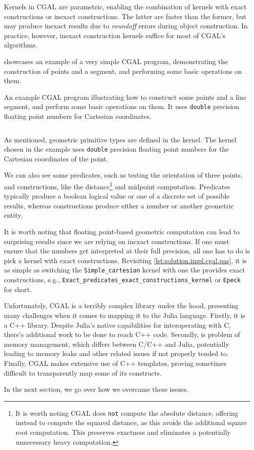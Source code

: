 Kernels in \ac{CGAL} are parametric, enabling the combination of kernels with
exact constructions or inexact constructions.  The latter are faster than the
former, but may produce inexact results due to \textit{roundoff} errors during
object construction.  In practice, however, inexact construction kernels suffice
for most of \ac{CGAL}'s algorithms.

 showcases an example of a very simple
\ac{CGAL} program, demonstrating the construction of points and a segment, and
performing some basic operations on them.

\begin{listing}[htbp]
  \caption[CGAL: Three points and one segment]{
    An example CGAL program illustrating how to construct some points and a line
    segment, and perform some basic operations on them.  It uses
    \texttt{double} precision floating point numbers for Cartesian
    coordinates.}\label{lst:solution.impl.cgal.pas}
  \inputminted{cpp}{cpp/points_and_segments.cpp}
\end{listing}

As mentioned, geometric primitive types are defined in the kernel.  The kernel
chosen in the example uses \texttt{double} precision floating point numbers for
the Cartesian coordinates of the point.

We can also see some predicates, such as testing the orientation of three
points, and constructions, like the distance\footnote{It is worth noting
\ac{CGAL} does \texttt{not} compute the absolute distance, offering instead to
compute the squared distance, as this avoids the additional square root
computation.  This preserves exactness and eliminates a potentially unnecessary
heavy computation.} and midpoint computation.  Predicates typically produce a
boolean logical value or one of a discrete set of possible results, whereas
constructions produce either a number or another geometric entity.

It is worth noting that floating point-based geometric computation can lead to
surprising results since we are relying on inexact constructions.  If one must
ensure that the numbers get interpreted at their full precision, all one has to
do is pick a kernel with exact constructions.  Revisiting
\cref{lst:solution.impl.cgal.pas}, it is as simple as switching the
\texttt{Simple\_cartesian} kernel with one the provides exact constructions,
e.g., \texttt{Exact\_predicates\_exact\_constructions\_kernel} or \texttt{Epeck}
for short.

Unfortunately, \ac{CGAL} is a terribly complex library under the hood,
presenting many challenges when it comes to mapping it to the Julia language.
Firstly, it is a C++ library.  Despite Julia's native capabilities for
interoperating with C, there's additional work to be done to reach C++ code.
Secondly, is problem of memory management, which differs between C/C++ and
Julia, potentially leading to memory leaks and other related issues if not
properly tended to.  Finally, \ac{CGAL} makes extensive use of C++ templates,
proving sometimes difficult to transparently map some of its constructs.

In the next section, we go over how we overcame these issues.
